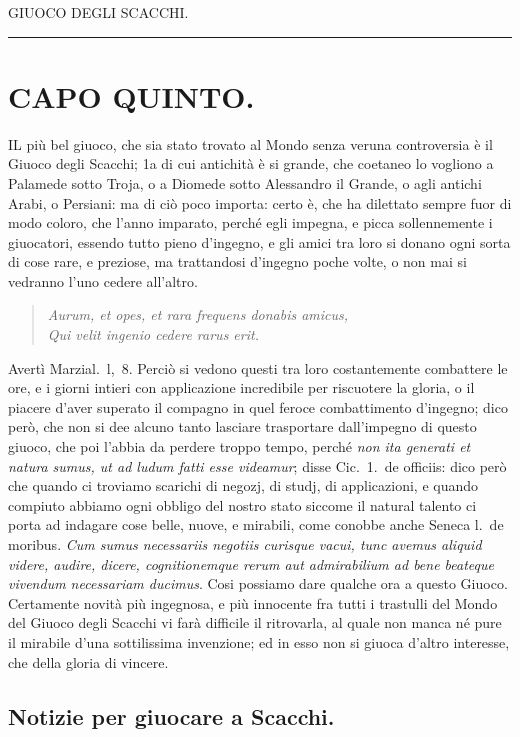 \documentclass[11pt,a6paper]{article}
\newcommand{\literaryquote}[1]{%
\kern -6pt  \begin{verse}
    {\footnotesize \it #1}
  \end{verse}\kern -2pt%
}
\newcommand{\supersection}[1]{%
\clearpage
    {\scshape \centering \huge #1\\}
    \vspace{6pt}
    \hrule
    \vspace{12pt}
}
\begin{document}
\supersection{GIUOCO DEGLI SCACCHI.}
\section{CAPO QUINTO.}

\lettrine{I}L più bel giuoco, che sia stato trovato al
Mondo senza veruna controversia è il
Giuoco degli Scacchi; 1a di cui antichità è
si grande, che coetaneo lo vogliono a Palamede
sotto Troja, o a Diomede sotto Alessandro
il Grande, o agli antichi Arabi, o Persiani:
ma di ciò poco importa: certo è, che
ha dilettato sempre fuor di modo coloro, che
l'anno imparato, perché egli impegna, e picca
sollennemente i giuocatori, essendo tutto
pieno d'ingegno, e gli amici tra loro si donano
ogni sorta di cose rare, e preziose, ma
trattandosi d'ingegno poche volte, o non mai
si vedranno l'uno cedere all'altro.
\literaryquote{
 Aurum, et opes, et rara frequens donabis amicus,\\
 Qui velit ingenio cedere rarus erit.}

Avertì Marzial.\ l,\ 8. Perciò si vedono questi
tra loro costantemente combattere le ore, e
i giorni intieri con applicazione incredibile
per riscuotere la gloria, o il piacere d'aver
superato il compagno in quel feroce combattimento
d'ingegno; dico però, che non si
dee alcuno tanto lasciare trasportare dall'impegno
di questo giuoco, che poi l'abbia da
perdere troppo tempo, perché \textit{non ita generati
et natura sumus, ut ad ludum fatti esse
videamur}; disse Cic.\ 1.\ de officiis: dico però
che quando ci troviamo scarichi di negozj, di
studj, di applicazioni, e quando compiuto abbiamo
ogni obbligo del nostro stato siccome il
natural talento ci porta ad indagare cose
belle, nuove, e mirabili, come conobbe anche
Seneca l.\ de moribus. \textit{Cum sumus necessariis
negotiis curisque vacui, tunc avemus aliquid
videre, audire, dicere, cognitionemque
rerum aut admirabilium ad bene beateque vivendum
necessariam ducimus}. Cosi possiamo
dare qualche ora a questo Giuoco. Certamente
novità più ingegnosa, e più innocente
fra tutti i trastulli del Mondo del Giuoco degli
Scacchi vi farà difficile il ritrovarla, al quale
non manca né pure il mirabile d'una sottilissima
invenzione; ed in esso non si giuoca d'altro
interesse, che della gloria di vincere.

\subsection{Notizie per giuocare a Scacchi.}
\end{document}
